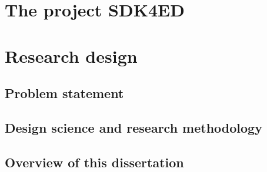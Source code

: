 \section{The project SDK4ED}

\section{Research design}
\subsection{Problem statement}
\subsection{Design science and research methodology}
\subsection{Overview of this dissertation}

